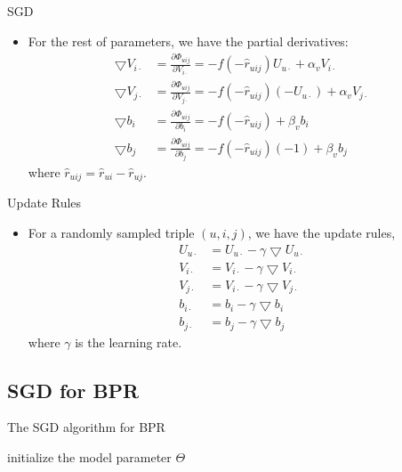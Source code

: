 \begin{frame}{SGD}
	\begin{itemize}
		\item For the rest of parameters, we have the partial derivatives:
		\begin{align} %
		\bigtriangledown V_{i\cdot} &= \frac{\partial \Phi_{uij}}{\partial V_{i\cdot}}=-f\left(-\hat{r}_{uij}\right)U_{u\cdot} + \alpha_vV_{i\cdot}\\
		\bigtriangledown V_{j\cdot} &= \frac{\partial \Phi_{uij}}{\partial V_{j\cdot}}=-f\left(-\hat{r}_{uij}\right)\left(-U_{u\cdot}\right) + \alpha_vV_{j\cdot}\\
		\bigtriangledown b_i        &= \frac{\partial \Phi_{uij}}{\partial b_i} =-f\left(-\hat{r}_{uij}\right)+\beta_vb_i\\
		\bigtriangledown b_j        &= \frac{\partial \Phi_{uij}}{\partial b_j} =-f\left(-\hat{r}_{uij}\right)\left(-1\right)+\beta_vb_j
		\end{align}
		where $ \hat{r}_{uij} = \hat{r}_{ui} - \hat{r}_{uj}$. 
	\end{itemize}
\end{frame}
\begin{frame}{Update Rules}
	\begin{itemize}
		\item For a randomly sampled triple $(u,i,j)$, we have the update rules,
		\begin{align}
		\label{eq10}
		U_{u\cdot} &= U_{u\cdot} - \gamma\bigtriangledown U_{u\cdot}\\
		V_{i\cdot} &= V_{i\cdot} - \gamma\bigtriangledown V_{i\cdot}\\
		V_{j\cdot} &= V_{i\cdot} - \gamma\bigtriangledown V_{j\cdot}\\
		b_{i\cdot} &= b_i - \gamma\bigtriangledown b_{i}\\
		b_{j\cdot} &= b_j - \gamma\bigtriangledown b_{j}
		\end{align}
		where $\gamma$ is the learning rate.
	\end{itemize}
\end{frame}

\subsection*{SGD for BPR}
\begin{frame}{The SGD algorithm for BPR}
	\IncMargin{1em}%
	\begin{algorithm}[H]%
		\SetAlgoNoLine %
		\BlankLine
		
		initialize the model parameter $\Theta$\;
		\caption{The SGD algorithm for BPR}
		\label{al1}%
	\end{algorithm}
	\DecMargin{1em}
	
\end{frame}

